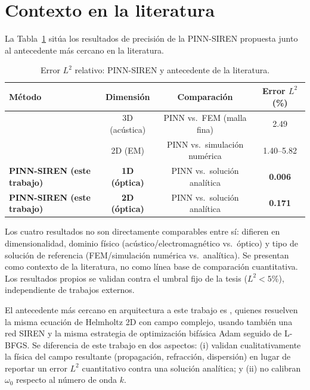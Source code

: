 \section{Contexto en la literatura}
\label{sec:comparativa}

La Tabla~\ref{tab:comparativa} sitúa los resultados de precisión de la
PINN-SIREN propuesta junto al antecedente más cercano en la literatura.

\begin{table}[H]
\centering
\begin{threeparttable}
\caption{Error $L^2$ relativo: PINN-SIREN y antecedente de la literatura.}
\label{tab:comparativa}
\begin{tabular}{lccc}
\toprule
Método & Dimensión & Comparación & Error $L^2$ (\%) \\
\midrule
\textcite{schoder2024helmholtz} & 3D (acústica) & PINN vs.\ FEM (malla fina) & 2.49 \\
\textcite{zhang2025fepirbn} & 2D (EM) & PINN vs.\ simulación numérica & 1.40--5.82 \\
\textbf{PINN-SIREN (este trabajo)} & \textbf{1D (óptica)} & PINN vs.\ solución analítica & \textbf{0.006} \\
\textbf{PINN-SIREN (este trabajo)} & \textbf{2D (óptica)} & PINN vs.\ solución analítica & \textbf{0.171} \\
\bottomrule
\end{tabular}
\begin{tablenotes}\small
    \item Los cuatro resultados no son directamente comparables entre sí:
    difieren en dimensionalidad, dominio físico (acústico/electromagnético
    vs.\ óptico) y tipo de solución de referencia (FEM/simulación numérica vs.\
    analítica). Se presentan como contexto de la literatura, no como línea
    base de comparación cuantitativa. Los resultados propios se validan
    contra el umbral fijo de la tesis ($L^2 < 5\%$), independiente de
    trabajos externos.
\end{tablenotes}
\end{threeparttable}
\end{table}

El antecedente más cercano en arquitectura a este trabajo es
\textcite{panagiotakopoulos2026helmholtz}, quienes resuelven la misma ecuación
de Helmholtz 2D con campo complejo, usando también una red SIREN y la misma
estrategia de optimización bifásica Adam seguido de L-BFGS. Se diferencia de
este trabajo en dos aspectos: (i) validan cualitativamente la física del
campo resultante (propagación, refracción, dispersión) en lugar de reportar
un error $L^2$ cuantitativo contra una solución analítica; y (ii) no calibran
$\omega_0$ respecto al número de onda $k$.

